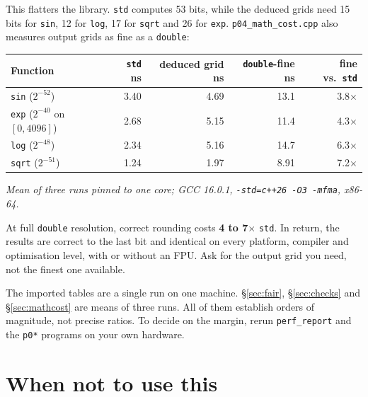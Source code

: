 \documentclass[11pt,a4paper]{article}
\newcommand{\code}[1]{\texttt{\small #1}}
\newcommand{\file}[1]{\texttt{\small #1}}
\begin{document}
\noindent
This flatters the library. \code{std} computes 53 bits, while the deduced
grids need 15 bits for \code{sin}, 12 for \code{log}, 17 for \code{sqrt} and
26 for \code{exp}. \file{p04\_math\_cost.cpp} also measures output grids as
fine as a \code{double}:

\begin{center}
\small
\begin{tabular}{@{}l r r r r@{}}
\toprule
Function & \code{std} ns & deduced grid ns & \code{double}-fine ns & fine vs.\ \code{std} \\
\midrule
\code{sin}  ($2^{-52}$) & 3.40 & 4.69 & 13.1 & 3.8$\times$ \\
\code{exp}  ($2^{-40}$ on $[0,4096]$) & 2.68 & 5.15 & 11.4 & 4.3$\times$ \\
\code{log}  ($2^{-48}$) & 2.34 & 5.16 & 14.7 & 6.3$\times$ \\
\code{sqrt} ($2^{-51}$) & 1.24 & 1.97 & 8.91 & 7.2$\times$ \\
\bottomrule
\end{tabular}
\end{center}

\noindent
\emph{Mean of three runs pinned to one core; GCC 16.0.1,
\code{-std=c++26 -O3 -mfma}, x86-64.}

At full \code{double} resolution, correct rounding costs \textbf{4 to
7$\times$} \code{std}. In return, the results are correct to the last bit and
identical on every platform, compiler and optimisation level, with or without
an FPU. Ask for the output grid you need, not the finest one available.

\medskip
\noindent
The imported tables are a single run on one machine. \S\ref{sec:fair},
\S\ref{sec:checks} and \S\ref{sec:mathcost} are means of three runs. All of
them establish orders of magnitude, not precise ratios. To decide on the
margin, rerun \code{perf\_report} and the \file{p0*} programs on your own
hardware.

\section{When not to use this}\label{sec:limits}
\end{document}

